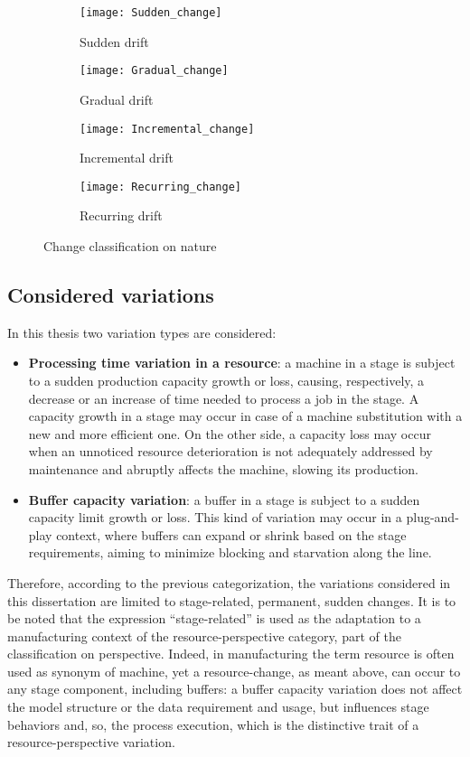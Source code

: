 \begin{figure}[H]
  \centering
  \begin{subfigure}[b]{0.4\textwidth}
    \texttt{[image: Sudden\_change]}
    \caption{Sudden drift}
    \label{fig:Sudden drift}   
  \end{subfigure}
  \hspace{0.1\textwidth}
  \begin{subfigure}[b]{0.4\textwidth}
    \texttt{[image: Gradual\_change]}
    \caption{Gradual drift}
    \label{fig:Gradual drift}
  \end{subfigure}
  \begin{subfigure}[b]{0.4\textwidth}
    \texttt{[image: Incremental\_change]}
    \caption{Incremental drift}
    \label{fig:Incremental drift}
  \end{subfigure}
  \hspace{0.1\textwidth}
  \begin{subfigure}[b]{0.4\textwidth}
    \texttt{[image: Recurring\_change]}
    \caption{Recurring drift}
    \label{fig:Recurring drift}
  \end{subfigure}
  \caption{Change classification on nature}
  \label{fig:Change classification on nature}
\end{figure}
\subsection{Considered variations}
In this thesis two variation types are considered:
\begin{itemize}
\item \textbf{Processing time variation in a resource}: a machine in a stage is subject to a sudden production capacity growth or loss, causing, respectively, a decrease or an increase of time needed to process a job in the stage. A capacity growth in a stage may occur in case of a machine substitution with a new and more efficient one. On the other side, a capacity loss may occur when an unnoticed resource deterioration is not adequately addressed by maintenance and abruptly affects the machine, slowing its production.
\item \textbf{Buffer capacity variation}: a buffer in a stage is subject to a sudden capacity limit growth or loss. This kind of variation may occur in a plug-and-play context, where buffers can expand or shrink based on the stage requirements, aiming to minimize blocking and starvation along the line. 
\end{itemize}
Therefore, according to the previous categorization, the variations considered in this dissertation are limited to stage-related, permanent, sudden changes. It is to be noted that the expression “stage-related” is used as the adaptation to a manufacturing context of the resource-perspective category, part of the classification on perspective. Indeed, in manufacturing the term resource is often used as synonym of machine, yet a resource-change, as meant above, can occur to any stage component, including buffers: a buffer capacity variation does not affect the model structure or the data requirement and usage, but influences stage behaviors and, so, the process execution, which is the distinctive trait of a resource-perspective variation. 